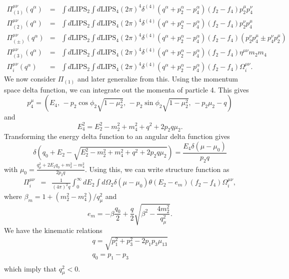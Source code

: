 \documentclass[12pt,letter]{article}
\begin{document}
\begin{eqnarray*}
\Pi_{(1)}^{\mu \nu}(q^\alpha) &=& \int d\textrm{LIPS}_2 \int d\textrm{LIPS}_4
(2 \pi)^4 \delta^{(4)}\left(q^\alpha + p^\alpha_2 - p^\alpha_4 \right) 
(f_2-f_4)p^\mu_2 p^\nu_4 \nonumber\\
\Pi_{(2)}^{\mu \nu}(q^\alpha) &=& \int d\textrm{LIPS}_2 \int d\textrm{LIPS}_4
(2 \pi)^4 \delta^{(4)}\left(q^\alpha + p^\alpha_2 - p^\alpha_4 \right) 
(f_2-f_4) p^\nu_2 p^\mu_4 \nonumber\\
\Pi_{(\pm)}^{\mu \nu}(q^\alpha) &=& \int d\textrm{LIPS}_2 \int d\textrm{LIPS}_4
(2 \pi)^4 \delta^{(4)}\left(q^\alpha + p^\alpha_2 - p^\alpha_4 \right) 
(f_2-f_4)(p^\nu_2 p^\mu_4 \pm p^\nu_4 p^\mu_2) \nonumber\\
\Pi_{(3)}^{\mu \nu}(q^\alpha) &=& \int d\textrm{LIPS}_2 \int d\textrm{LIPS}_4
(2 \pi)^4 \delta^{(4)}\left(q^\alpha + p^\alpha_2 - p^\alpha_4 \right) 
(f_2-f_4) \eta^{\mu \nu} m_2 m_4 \\
\Pi_{i}^{\mu \nu}(q^\alpha) &=& \int d\textrm{LIPS}_2 \int d\textrm{LIPS}_4
(2 \pi)^4 \delta^{(4)}\left(q^\alpha + p^\alpha_2 - p^\alpha_4 \right) 
(f_2-f_4) \Omega_i^{\mu \nu}.
\end{eqnarray*} 
We now consider $\Pi_{(1)}$ and later generalize from this.  Using the momentum space delta function, we can integrate out the momenta of particle 4.  This gives
\begin{equation*}
p^\mu_4 = (E_4, \, 
-p_2 \cos \phi_2 \sqrt{1-\mu_2^2}, \,
-p_2 \sin \phi_2 \sqrt{1-\mu_2^2}, \,
-p_2 \mu_2 - q)
\end{equation*}
and 
\begin{equation*}
E_4^2 = E_2^2 - m_2^2 + m_4^2 + q^2 + 2 p_2 q \mu_2.  
\end{equation*}
Transforming the energy delta function to an angular delta function gives 
\begin{equation*}
\delta\left(q_0 + E_2 - \sqrt{E_2^2 - m_2^2 + m_4^2 + q^2 + 2 p_2 q \mu_2} \right) 
= \frac{E_4 \delta(\mu - \mu_0)}{p_2 q} 
\end{equation*} 
with $\mu_0 = \frac{q_\mu^2 + 2 E_2 q_0 + m_2^2 - m_4^2}{2 p_2 q}$.  Using this, we can write structure function as 
\begin{eqnarray*}
\Pi^{\mu \nu}_{i} &=& \frac{1}{(4 \pi)^2 q} \int_{0}^\infty dE_2 
\int d \Omega_2 \delta(\mu - \mu_0) \theta(E_2-e_{m})
(f_2 - f_4) \Omega_i^{\mu \nu},
\end{eqnarray*} 
where $\beta_m = 1 + (m_2^2 - m_4^2)/q_\mu^2$ and
\begin{equation}
e_{m}=-\beta \frac{q_0}{2} + \frac{q}{2} \sqrt{\beta^2 - \frac{4 m_2^2}{q_\mu^2}}.
\end{equation}  
We have the kinematic relations
\begin{eqnarray*}
q = \sqrt{p_1^2 + p_3^2 - 2 p_1 p_3 \mu_{13}} \\
q_0 = p_1 - p_3 \\ 
\end{eqnarray*}
which imply that $q_\mu^2 < 0$.
\end{document}
